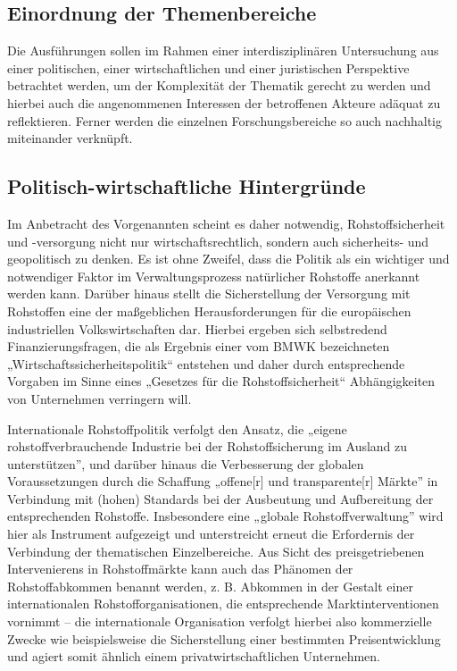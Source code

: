 \documentclass[12pt,a4paper,oneside]{book} %
\begin{document}
	
	
	\subsection{Einordnung der Themenbereiche}
	Die Ausführungen sollen im Rahmen einer interdisziplinären Untersuchung aus einer politischen, einer wirtschaftlichen und einer juristischen Perspektive betrachtet werden, um der Komplexität der Thematik gerecht zu werden und hierbei auch die angenommenen Interessen der betroffenen Akteure adäquat zu reflektieren. Ferner werden die einzelnen Forschungsbereiche so auch nachhaltig miteinander verknüpft.
	
	\subsection{Politisch-wirtschaftliche Hintergründe}
	
	Im Anbetracht des Vorgenannten scheint es daher notwendig, Rohstoffsicherheit und -versorgung nicht nur wirtschaftsrechtlich, sondern auch sicherheits- und geopolitisch zu denken. Es ist ohne Zweifel, dass die Politik als ein wichtiger und notwendiger Faktor im Verwaltungsprozess natürlicher Rohstoffe anerkannt werden kann.\autocite[hierzu ausführlich][239-248]{henning_politics_1968} Darüber hinaus stellt die Sicherstellung der Versorgung mit Rohstoffen eine der maßgeblichen Herausforderungen für die europäischen industriellen Volkswirtschaften dar.\autocite{europaische_kommission_study_2023} Hierbei ergeben sich selbstredend Finanzierungsfragen, die als Ergebnis einer vom BMWK bezeichneten „Wirtschaftssicherheitspolitik“ entstehen und daher durch entsprechende Vorgaben im Sinne eines „Gesetzes für die Rohstoffsicherheit“ Abhängigkeiten von Unternehmen verringern will.\autocite{lohr_gesetz_2022}
	
	Internationale Rohstoffpolitik verfolgt den Ansatz, die „eigene rohstoffverbrauchende Industrie bei der Rohstoffsicherung im Ausland zu unterstützen”, und darüber hinaus die Verbesserung der globalen Voraussetzungen durch die Schaffung „offene[r] und transparente[r] Märkte” in Verbindung mit (hohen) Standards bei der Ausbeutung und Aufbereitung der entsprechenden Rohstoffe.\autocite{acatech__deutsche_akademie_der_technikwissenschaften_rohstoffe_2017} Insbesondere eine „globale Rohstoffverwaltung” wird hier als Instrument aufgezeigt und unterstreicht erneut die Erfordernis der Verbindung der thematischen Einzelbereiche. Aus Sicht des preisgetriebenen Intervenierens in Rohstoffmärkte kann auch das Phänomen der Rohstoffabkommen benannt werden, z. B. Abkommen in der Gestalt einer internationalen Rohstofforganisationen, die entsprechende Marktinterventionen vornimmt – die internationale Organisation verfolgt hierbei also kommerzielle Zwecke wie beispielsweise die Sicherstellung einer bestimmten Preisentwicklung und agiert somit ähnlich einem privatwirtschaftlichen Unternehmen.\autocite[Paragraph 11, Rn. 4]{herdegen_internationales_2020}
	
\end{document}
